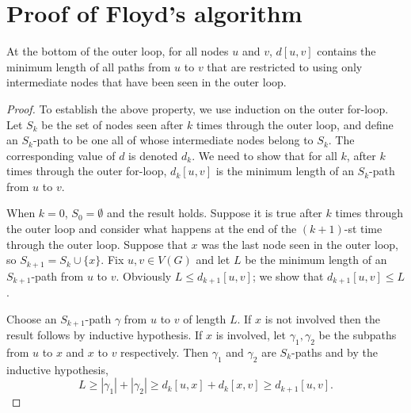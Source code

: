 \section{Proof of Floyd's algorithm}

\begin{Theorem}
\label{thm:floyd}
At the bottom of the outer  loop, for all nodes $u$ and $v$,
$d[u,v]$ contains the minimum length of all paths from $u$ to $v$ that
are restricted to using only intermediate nodes that have been seen in
the outer  loop. 
\end{Theorem}


\begin{proof}
To establish the above property, we use induction on the outer for-loop.
Let $S_k$ be the set of nodes seen after $k$ times through the
outer loop, and define an $S_k$-path  to be one all of whose
intermediate nodes belong to $S_k$. The corresponding value of $d$ is 
denoted $d_k$. We need to show that for all $k$, after $k$ times through 
the outer for-loop, $d_k[u,v]$ is the minimum length of an $S_k$-path 
from $u$ to $v$. 

When $k=0$, $S_0 = \emptyset$ and the result holds. Suppose
it is true after $k$ times through the outer loop and consider what
happens at the end of the $(k+1)$-st time through the outer loop.
Suppose that $x$ was the last node seen in the outer loop, so $S_{k+1}=
S_k \cup \{x\}$. Fix $u, v\in V(G)$ and let $L$ be the minimum length of
an $S_{k+1}$-path from $u$ to $v$. Obviously $L \leq d_{k+1}[u,v]$; we
show that $d_{k+1}[u,v] \leq L$. 

Choose an $S_{k+1}$-path $\gamma$ from $u$ to $v$ of length $L$. If $x$
is not involved then the result follows by inductive hypothesis. If $x$
is involved, let $\gamma_1, \gamma_2$ be the subpaths from $u$ to $x$
and $x$ to $v$ respectively. Then $\gamma_1$ and $\gamma_2$ are
$S_k$-paths and by the inductive hypothesis, $$L \geq |\gamma_1| +
|\gamma_2| \geq d_k[u,x] + d_k[x,v] \geq d_{k+1}[u,v].$$
\end{proof}


